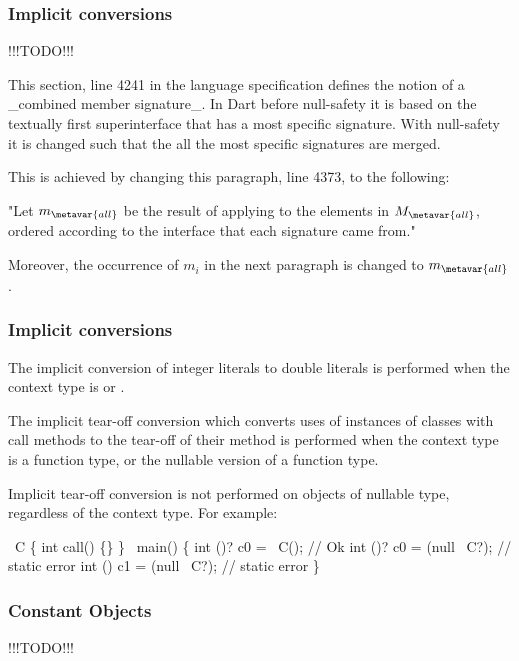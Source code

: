 \documentclass[makeidx]{article}
\begin{document}
{\subsubsection{Implicit conversions}

!!!TODO!!!

This section, line 4241
in the language specification defines the notion of a _combined member
signature_. In Dart before null-safety it is based on the textually first
superinterface that has a most specific signature. With null-safety it
is changed such that the all the most specific signatures are merged.

This is achieved by changing this paragraph, line 4373,
to the following:

"Let $m_{\metavar{all}}$ be the result of applying \TopMergeTypeName{} to
the elements in $M_{\metavar{all}}$, ordered according to the interface
 that each signature came from."

Moreover, the occurrence of $m_i$ in the next paragraph is
changed to $m_{\metavar{all}}$.

\subsubsection{Implicit conversions}

The implicit conversion of integer literals to double literals is performed when
the context type is  or .

The implicit tear-off conversion which converts uses of instances of classes
with call methods to the tear-off of their \CALL{} method is performed when the
context type is a function type, or the nullable version of a function type.

Implicit tear-off conversion is not performed on objects of nullable type,
regardless of the context type.  For example:

\begin{dartCode}
\CLASS\ C \{
  int call() \{\}
\}
\VOID\ main() \{
  int \FUNCTION()? c0 = \NEW\ C(); // Ok
  int \FUNCTION()? c0 = (null \AS\ C?); // static error
  int \FUNCTION()  c1 = (null \AS\ C?); // static error
\}
\end{dartCode}

\subsubsection{Constant Objects}

!!!TODO!!!

}
\end{document}
